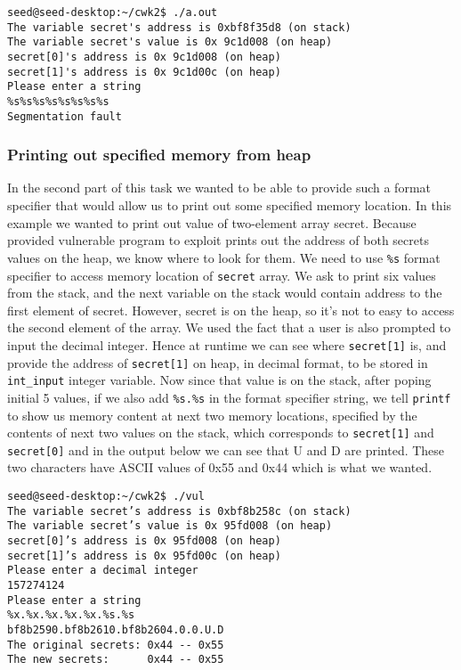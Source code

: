 \documentclass[12pt, a4paper, pdflatex]{article}
\begin{document}
\vspace{1em}
\lstset{
	captionpos=b,
	frame=single,
	language=bash,
  breaklines=true,
	caption=Example of crashing the program,
	label=printf:crash,
  float=tb
}
\begin{lstlisting}
seed@seed-desktop:~/cwk2$ ./a.out 
The variable secret's address is 0xbf8f35d8 (on stack)
The variable secret's value is 0x 9c1d008 (on heap)
secret[0]'s address is 0x 9c1d008 (on heap)
secret[1]'s address is 0x 9c1d00c (on heap)
Please enter a string
%s%s%s%s%s%s%s%s
Segmentation fault
\end{lstlisting}

\subsubsection{Printing out specified memory from heap}
In the second part of this task we wanted to be able to provide such a format specifier that would allow us to print out some specified memory location. In this example we wanted to print out value of two-element array secret. Because provided vulnerable program to exploit prints out the address of both secrets values on the heap, we know where to look for them. We need to use \texttt{\%s} format specifier to access memory location of 
\texttt{secret} array. We ask to print six values from the stack, and the next variable on the stack would contain address to the first element of secret. However, secret is on the heap, so it's not to easy to access the second element of the array. We used the fact that a user is also prompted to input the decimal integer. Hence at runtime we can see where \texttt{secret[1]} is, and provide the address of \texttt{secret[1]} on heap, in decimal format, to be stored in \texttt{int\_input} integer variable. Now since that value is on the stack, after poping initial 5 values, if we also add \texttt{\%s.\%s} in the format specifier string, we tell \texttt{printf} to show us memory content at next two memory locations, specified by the contents of next two values on the stack, which corresponds to \texttt{secret[1]} and \texttt{secret[0]} and in the output below we can see that U and D are printed. These two characters have ASCII values of 0x55 and 0x44 which is what we wanted.

\vspace{1em}
\lstset{
	captionpos=b,
	frame=single,
	language=bash,
  breaklines=true,
	caption=Example of printing out memory,
	label=printf:crash,
  float=tb
}
\begin{lstlisting}
seed@seed-desktop:~/cwk2$ ./vul
The variable secret’s address is 0xbf8b258c (on stack)
The variable secret’s value is 0x 95fd008 (on heap)
secret[0]’s address is 0x 95fd008 (on heap)
secret[1]’s address is 0x 95fd00c (on heap)
Please enter a decimal integer
157274124
Please enter a string
%x.%x.%x.%x.%x.%s.%s   
bf8b2590.bf8b2610.bf8b2604.0.0.U.D
The original secrets: 0x44 -- 0x55
The new secrets:      0x44 -- 0x55
\end{lstlisting}
\end{document}
